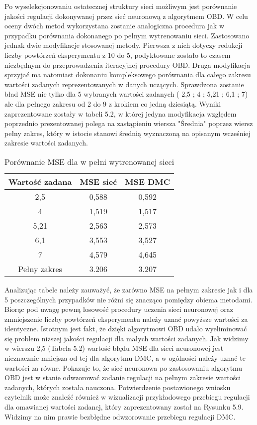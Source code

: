 \par Po wyselekcjonowaniu ostatecznej struktury sieci możliwym jest porównanie jakości regulacji dokonywanej przez sieć neuronową z algorytmem OBD. W celu oceny dwóch metod wykorzystana zostanie analogiczna procedura jak w przypadku porównania dokonanego po pełnym wytrenowaniu sieci. Zastosowano jednak dwie modyfikacje stosowanej metody. Pierwsza z nich dotyczy redukcji liczby powtórzeń eksperymentu z 10 do 5, podyktowane zostało to czasem niezbędnym do przeprowadzenia iteracyjnej procedury OBD. Druga modyfikacja sprzyjać ma natomiast dokonaniu kompleksowego porównania dla całego zakresu wartości zadanych reprezentowanych w danych uczących. Sprawdzona zostanie bład MSE nie tylko dla 5 wybranych wartości zadanych ( 2,5 ; 4 ; 5,21 ; 6,1 ; 7) ale dla pełnego zakresu od 2 do 9 z krokiem co jedną dziesiątą. Wyniki zaprezentowane zostały w tabeli 5.2, w której jedyna modyfikacja względem poprzednio prezentowanej polega na zastąpieniu wiersza "Średnia" poprzez wiersz pełny zakres, który w istocie stanowi średnią wyznaczoną na opisanym wcześniej zakresie wartości zadanych.

\begin{table}[!h] \label{tab:tabela2} \centering
\caption{Porównanie MSE dla w pełni wytrenowanej sieci}
\begin{tabular} {| c | c | c |} \hline
    Wartość zadana & MSE sieć & MSE DMC \\ \hline\hline
    2,5 & 0,588 & 0,592 \\ \hline
    4 & 1,519 & 1,517 \\ \hline
    5,21 & 2,563 & 2,573 \\ \hline
    6,1 & 3,553 & 3,527 \\ \hline
    7 & 4,579 & 4,645 \\ \hline
    Pełny zakres & 3.206  & 3.207 \\ \hline  
\end{tabular}
\end{table}

\par Analizując tabele należy zauważyć, że zarówno MSE na pełnym zakresie jak i dla 5 poszczególnych przypadków nie różni się znacząco pomiędzy obiema metodami. Biorąc pod uwagę pewną losowość procedury uczenia sieci neuronowej oraz zmniejszenie liczby powtórzeń eksperymentu należy uznać powyższe wartości za identyczne. Istotnym jest fakt, że dzięki algorytmowi OBD udało wyeliminować się problem niższej jakości regulacji dla małych wartości zadanych. Jak widzimy w wierszu 2,5 (Tabela 5.2)  wartość błędu MSE dla sieci neuronowej jest nieznacznie mniejsza od tej dla algorytmu DMC, a w ogólności należy uznać te wartości za równe. Pokazuje to, że sieć neuronowa po zastosowaniu algorytmu OBD jest w stanie odwzorować zadanie regulacji na pełnym zakresie wartości zadanych, których została nauczona. Potwierdzenie postawionego wniosku czytelnik może znaleźć również w wizualizacji przykładowego przebiegu regulacji dla omawianej wartości zadanej, który zaprezentowany został na Rysunku 5.9. Widzimy na nim prawie bezbłędne odwzorowanie przebiegu regulacji DMC. 

